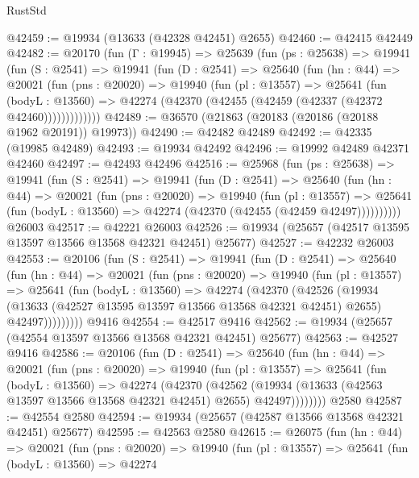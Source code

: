 \begin{lexlean}{RustStd}
\begin{coremodule}
@42459 := @19934 (@13633 (@42328 @42451) @2655)
@42460 := @42415 @42449
@42482 := @20170
    (fun (Γ : @19945) =>
    @25639
      (fun (ps : @25638) =>
      @19941
        (fun (S : @2541) =>
        @19941
          (fun (D : @2541) =>
          @25640
            (fun (hn : @44) =>
            @20021
              (fun (pns : @20020) =>
              @19940
                (fun (pl : @13557) =>
                @25641
                  (fun (bodyL : @13560) =>
                  @42274 (@42370 (@42455 (@42459 (@42337 (@42372 @42460)))))))))))))
@42489 := @36570 (@21863 (@20183 (@20186 (@20188 @1962 @20191)) @19973))
@42490 := @42482 @42489
@42492 := @42335 (@19985 @42489)
@42493 := @19934 @42492
@42496 := @19992 @42489 @42371 @42460
@42497 := @42493 @42496
@42516 := @25968
    (fun (ps : @25638) =>
    @19941
      (fun (S : @2541) =>
      @19941
        (fun (D : @2541) =>
        @25640
          (fun (hn : @44) =>
          @20021
            (fun (pns : @20020) =>
            @19940
              (fun (pl : @13557) =>
              @25641 (fun (bodyL : @13560) => @42274 (@42370 (@42455 (@42459 @42497))))))))))
    @26003
@42517 := @42221 @26003
@42526 := @19934 (@25657 (@42517 @13595 @13597 @13566 @13568 @42321 @42451) @25677)
@42527 := @42232 @26003
@42553 := @20106
    (fun (S : @2541) =>
    @19941
      (fun (D : @2541) =>
      @25640
        (fun (hn : @44) =>
        @20021
          (fun (pns : @20020) =>
          @19940
            (fun (pl : @13557) =>
            @25641
              (fun (bodyL : @13560) =>
              @42274
                (@42370
                  (@42526
                    (@19934
                      (@13633 (@42527 @13595 @13597 @13566 @13568 @42321 @42451) @2655)
                      @42497)))))))))
    @9416
@42554 := @42517 @9416
@42562 := @19934 (@25657 (@42554 @13597 @13566 @13568 @42321 @42451) @25677)
@42563 := @42527 @9416
@42586 := @20106
    (fun (D : @2541) =>
    @25640
      (fun (hn : @44) =>
      @20021
        (fun (pns : @20020) =>
        @19940
          (fun (pl : @13557) =>
          @25641
            (fun (bodyL : @13560) =>
            @42274
              (@42370
                (@42562
                  (@19934 (@13633 (@42563 @13597 @13566 @13568 @42321 @42451) @2655) @42497))))))))
    @2580
@42587 := @42554 @2580
@42594 := @19934 (@25657 (@42587 @13566 @13568 @42321 @42451) @25677)
@42595 := @42563 @2580
@42615 := @26075
    (fun (hn : @44) =>
    @20021
      (fun (pns : @20020) =>
      @19940
        (fun (pl : @13557) =>
        @25641
          (fun (bodyL : @13560) =>
          @42274

\end{coremodule}
\end{lexlean}
